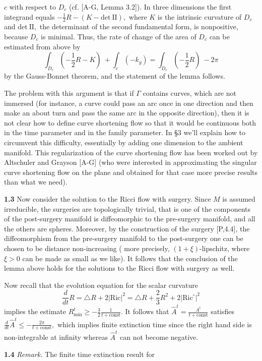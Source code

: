 \documentclass{article}
\newcommand{\co}{\mathrm{const}}
\begin{document}
$c$ with respect to $D_c$ (cf. [A-G, Lemma 3.2]). In three
dimensions the first integrand equals
$-\frac{1}{2}R-(K-\mathrm{det \ II}),$ where $K$ is the intrinsic
curvature of $D_c$ and $\mathrm{det \ II},$ the determinant of the
second fundamental form, is nonpositive, because $D_c$ is minimal.
Thus, the rate of change of the area of $D_c$ can be estimated
from above by $$ \int_{D_c}(-\frac{1}{2}R-K) \ + \int_c (-k_g) =
\int_{D_c}(-\frac{1}{2}R) \ -2\pi $$ by the Gauss-Bonnet theorem,
and the statement of the lemma follows.
\par The problem with this argument is that if $\Gamma$ contains
curves, which are not immersed (for instance, a curve could pass
an arc once in one direction and then make an about turn and pass
the same arc in the opposite direction), then it is not clear how
to define curve shortening flow so that it would be continuous
both in the time parameter and in the family parameter. In \S 3
we'll explain how to circumvent this difficulty, essentially by
adding one dimension to the ambient manifold. This regularization
of the curve shortening flow has been worked out by Altschuler and
Grayson [A-G] (who were interested in approximating the singular
curve shortening flow on the plane and obtained for that case more
precise results than what we need).
\par {\bf 1.3} Now consider the solution to the Ricci flow with
surgery. Since $M$ is assumed irreducible, the surgeries are
topologically trivial, that is one of the components of the
post-surgery manifold is diffeomorphic to the pre-surgery
manifold, and all the others are spheres. Moreover, by the
construction of the surgery [P,4.4], the diffeomorphism from the
pre-surgery manifold to the post-surgery one can be chosen to be
distance non-increasing ( more precisely, $(1+\xi)$-lipschitz,
where $\xi>0$ can be made as small as we like). It follows that
the conclusion of the lemma above holds for the solutions to the
Ricci flow with surgery as well.
\par Now recall that the evolution equation for the scalar
curvature $$ \frac{d}{dt}R=\triangle R +
2|\mathrm{Ric}|^2=\triangle
R+\frac{2}{3}R^2+2|\mathrm{Ric}^{\circ}|^2 $$ implies the estimate
$R^t_{\mathrm{min}}\ge -\frac{3}{2}\frac{1}{t+\co}.$ It follows
that $\hat{A}^t=\frac{A^t}{t+\co}$ satisfies
$\frac{d}{dt}\hat{A}^t\le -\frac{2\pi}{t+\co},$ which implies
finite extinction time since the right hand side is non-integrable
at infinity whereas $\hat{A}^t$ can not become negative.
\par {\bf 1.4} {\it Remark.} The finite time extinction result for
\end{document}

